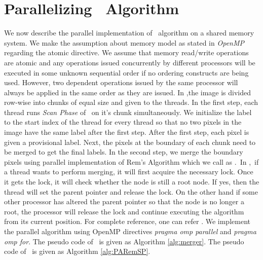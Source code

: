 \vspace{\sectionSpace}
\section{Parallelizing \aremsp\ Algorithm}
\label{sec:parallel_algo}

We now describe the parallel implementation of \aremsp\ algorithm 
on a shared memory system. We make the assumption about memory
model as stated in {\em OpenMP} regarding the atomic directive. We assume that
memory read/write operations are atomic and any operations issued concurrently by different processors will be executed in some unknown sequential order if
no ordering constructs are being used. However, two dependent operations issued
by the same processor will always be applied in the same order as they are
issued.
%
In \paremsp,the image is
divided row-wise into chunks of equal size and given to the threads. In the first step,
each thread runs {\em Scan Phase} of \aremsp\ on it's chunk simultaneously. We
initialize the label to the start index of the thread for every thread so that no 
two pixels in the image have the same label after the first step. After the first step, 
each pixel is given a provisional label. Next, the pixels at the boundary of
each chunk need to be merged to get the final labels. In the second step, we merge the boundary pixels using parallel 
implementation of Rem's Algorithm \cite{Patwary2012_PARemSP} which we call as
\merger.\ In \merger,\ if a thread wants to perform merging, it will first
acquire the necessary lock. Once it gets the lock, it will check whether the
node is still a root node. If yes, then the thread
will set the parent pointer and release the lock. On the other
hand if some other processor has altered the parent pointer so
that the node is no longer a root, the processor will release
the lock and continue executing the algorithm from its current
position. For complete reference, one can refer \cite{Patwary2012_PARemSP}. We
implement the parallel algorithm using OpenMP directives {\em pragma omp parallel} and {\em pragma omp for}. 
The pseudo code of \merger\ is given as Algorithm \ref{alg:merger}. 
The pseudo code of \paremsp\ is given as Algorithm
\ref{alg:PARemSP}.

 
  
